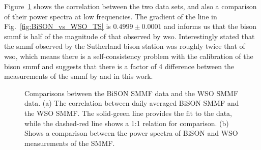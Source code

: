 Figure~\ref{fig:BiSON_vs_WSO} shows the correlation between the two data sets, and also a comparison of their power spectra at low frequencies. The gradient of the line in Fig.~\ref{fig:BiSON_vs_WSO_TS} is $0.4999\pm0.0001$ and informs us that the \gls{bison} \gls{smmf} is half of the magnitude of that observed by \gls{wso}. Interestingly \citet{chaplin_studies_2003} stated that the \gls{smmf} observed by the Sutherland \gls{bison} station was roughly twice that of \gls{wso}, which means there is a self-consistency problem with the calibration of the \gls{bison} \gls{smmf} and suggests that there is a factor of 4 difference between the measurements of the \gls{smmf} by \citet{chaplin_studies_2003} and in this work.

\begin{figure}[ht!]
	\centering
	\qquad
	\caption{Comparisons between the BiSON SMMF data and the WSO SMMF data. (a) The correlation between daily averaged BiSON SMMF and the WSO SMMF. The solid-green line provides the fit to the data, while the dashed-red line shows a 1:1 relation for comparison. (b) Shows a comparison between the power spectra of BiSON and WSO measurements of the SMMF.} \label{fig:BiSON_vs_WSO}
\end{figure}



